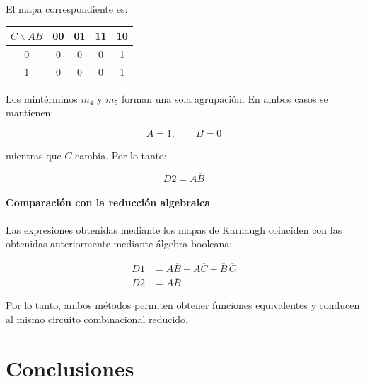 \documentclass[12pt]{report}
\begin{document}
El mapa correspondiente es:

\begin{center}
\begin{tabular}{c|cccc}
    $C\backslash AB$ & 00 & 01 & 11 & 10 \\
    \hline
    0 & 0 & 0 & 0 & 1 \\
    1 & 0 & 0 & 0 & 1
\end{tabular}
\end{center}

Los mintérminos $m_4$ y $m_5$ forman una sola agrupación. En ambos casos se mantienen:

\begin{equation}
    A=1,
    \qquad
    B=0
\end{equation}

mientras que $C$ cambia. Por lo tanto:

\begin{equation}
    \boxed{
    D2 = A\overline{B}
    }
\end{equation}


\subsubsection{Comparación con la reducción algebraica}

Las expresiones obtenidas mediante los mapas de Karnaugh coinciden con las obtenidas
anteriormente mediante álgebra booleana:

\begin{align}
    D1 &=
    A\overline{B}
    + A\overline{C}
    + \overline{B}\,\overline{C} \\
    D2 &= A\overline{B}
\end{align}

Por lo tanto, ambos métodos permiten obtener funciones equivalentes y conducen al
mismo circuito combinacional reducido.


\chapter{Conclusiones}\label{conclusion}




\end{document}
